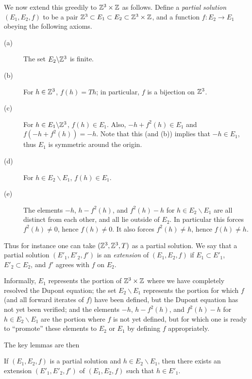 We now extend this greedily to $\mathbb{Z}^3 \times \mathbb{Z}$ as follows.  Define a \emph{partial solution} $(E_1,E_2,f)$ to be a pair $\mathbb{Z}^3 \subset E_1 \subset E_2 \subset \mathbb{Z}^3 \times \mathbb{Z}$, and a function $f: E_2 \to E_1$ obeying the following axioms.
\begin{description}
  \item[(a)] The set $E_2 \backslash \mathbb{Z}^3$ is finite.
  \item[(b)] For $h \in \mathbb{Z}^3$, $f(h) = Th$; in particular, $f$ is a bijection on $\mathbb{Z}^3$.
  \item[(c)] For $h \in E_1 \backslash \mathbb{Z}^3$, $f(h) \in E_1$.  Also, $-h + f^2(h) \in E_1$ and $f(-h + f^2(h)) = -h$. Note that this (and (b)) implies that $-h \in E_1$, thus $E_1$ is symmetric around the origin.
  \item[(d)] For $h \in E_2 \backslash E_1$, $f(h) \in E_1$.
  \item[(e)] The elements $-h$, $h - f^2(h)$, and $f^2(h) - h$ for $h \in E_2 \backslash E_1$ are all distinct from each other, and all lie outside of $E_2$.  In particular this forces $f^2(h) \neq 0$, hence $f(h) \neq 0$. It also forces $f^2(h) \neq h$, hence $f(h) \neq h$.
\end{description}
Thus for instance one can take $(\mathbb{Z}^3,\mathbb{Z}^3,T)$ as a partial solution.  We say that a partial solution $(E'_1, E'_2, f')$ is an \emph{extension} of $(E_1,E_2,f)$ if $E_1 \subset E'_1$, $E'_2 \subset E_2$, and $f'$ agrees with $f$ on $E_2$.

Informally, $E_1$ represents the portion of $\mathbb{Z}^3 \times \mathbb{Z}$ where we have completely resolved the Dupont equation; the set $E_2 \backslash E_1$ represents the portion for which $f$ (and all forward iterates of $f$) have been defined, but the Dupont equation has not yet been verified; and the elements $-h$, $h - f^2(h)$, and $f^2(h) - h$ for $h \in E_2 \backslash E_1$ are the portion where $f$ is not yet defined, but for which one is ready to ``promote'' these elements to $E_2$ or $E_1$ by defining $f$ appropriately.

The key lemmas are then

\begin{lemma}[Promoting to $E_1$]\label{add-E1}  If $(E_1,E_2,f)$ is a partial solution and $h \in E_2 \backslash E_1$, then there exists an extension $(E'_1,E'_2,f')$ of $(E_1,E_2,f)$ such that $h \in E'_1$.
\end{lemma}

